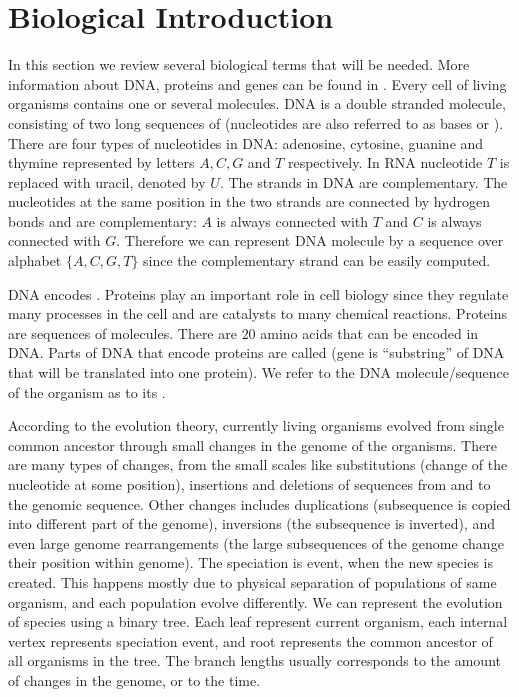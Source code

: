 \section{Biological Introduction}\label{SECTION:BIOINTRO}


In this section we review several biological terms that will be needed. More
information about DNA, proteins and genes can be found in
\cite{BiologyForDummies, UnderstandingBioinformatics}.  Every cell of living
organisms contains one or several  molecules. DNA is a double
stranded molecule, consisting of two long sequences of 
(nucleotides are also referred to as bases or ). There are
four types of nucleotides in DNA: adenosine, cytosine, guanine and thymine
represented by letters $A,C,G$ and $T$ respectively. In RNA nucleotide $T$ is
replaced with uracil, denoted by $U$. The strands in DNA are complementary. The
nucleotides at the same position in the two strands are connected by hydrogen
bonds and are complementary: $A$ is always connected with $T$ and $C$ is always
connected with $G$. Therefore we can represent DNA molecule by a sequence over
alphabet $\{A,C,G,T\}$ since the complementary strand can be easily computed.

DNA encodes . Proteins play an important role in cell
biology since  they regulate many processes in the cell and are catalysts to
many chemical reactions. Proteins are sequences of 
molecules. There are $20$ amino acids that can be encoded in DNA. Parts of DNA
that encode proteins are called  (gene is ``substring'' of
DNA that will be translated into one protein). We refer to the DNA molecule/sequence of
the organism as to its .

According to the evolution theory, currently living organisms evolved from
single common ancestor through small changes in the genome of the organisms.
There are many types of changes, from the small scales like substitutions
(change of the nucleotide at some position), insertions and deletions of
sequences from and to the genomic sequence. Other changes includes duplications
(subsequence is copied into different part of the genome), inversions (the
subsequence is inverted), and even large genome rearrangements (the large
subsequences of the genome change their position within genome). The speciation
is event, when the new species is created. This happens mostly due to physical
separation of populations of same organism, and each population evolve
differently. We can represent the evolution of species using a binary tree.
Each leaf represent current organism, each internal vertex represents
speciation event, and root represents the common ancestor of all organisms in
the tree. The branch lengths usually corresponds to the amount of changes in
the genome, or to the time. 

